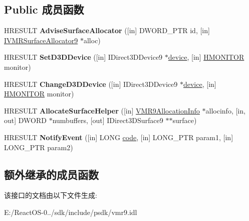 \subsection*{Public 成员函数}
\begin{DoxyCompactItemize}
\item 
\mbox{\label{interface_i_v_m_r_surface_allocator_notify9_aeddb07caec585fac147ac63ad9b7352d}} 
H\+R\+E\+S\+U\+LT {\bfseries Advise\+Surface\+Allocator} (\mbox{[}in\mbox{]} D\+W\+O\+R\+D\+\_\+\+P\+TR id, \mbox{[}in\mbox{]} \hyperlink{interface_i_v_m_r_surface_allocator9}{I\+V\+M\+R\+Surface\+Allocator9} $\ast$alloc)
\item 
\mbox{\label{interface_i_v_m_r_surface_allocator_notify9_a6fc50bf0e1d07c0b93470ddc4c45b142}} 
H\+R\+E\+S\+U\+LT {\bfseries Set\+D3\+D\+Device} (\mbox{[}in\mbox{]} I\+Direct3\+D\+Device9 $\ast$\hyperlink{structdevice}{device}, \mbox{[}in\mbox{]} \hyperlink{interfacevoid}{H\+M\+O\+N\+I\+T\+OR} monitor)
\item 
\mbox{\label{interface_i_v_m_r_surface_allocator_notify9_ab828cb18b6481c8e174277fc355c50d3}} 
H\+R\+E\+S\+U\+LT {\bfseries Change\+D3\+D\+Device} (\mbox{[}in\mbox{]} I\+Direct3\+D\+Device9 $\ast$\hyperlink{structdevice}{device}, \mbox{[}in\mbox{]} \hyperlink{interfacevoid}{H\+M\+O\+N\+I\+T\+OR} monitor)
\item 
\mbox{\label{interface_i_v_m_r_surface_allocator_notify9_ad7797d9c2fdd9194765b80db83f09927}} 
H\+R\+E\+S\+U\+LT {\bfseries Allocate\+Surface\+Helper} (\mbox{[}in\mbox{]} \hyperlink{struct___v_m_r9_allocation_info}{V\+M\+R9\+Allocation\+Info} $\ast$allocinfo, \mbox{[}in, out\mbox{]} D\+W\+O\+RD $\ast$numbuffers, \mbox{[}out\mbox{]} I\+Direct3\+D\+Surface9 $\ast$$\ast$surface)
\item 
\mbox{\label{interface_i_v_m_r_surface_allocator_notify9_a8a36e9e283149815b786d0baeac7d587}} 
H\+R\+E\+S\+U\+LT {\bfseries Notify\+Event} (\mbox{[}in\mbox{]} L\+O\+NG \hyperlink{structcode}{code}, \mbox{[}in\mbox{]} L\+O\+N\+G\+\_\+\+P\+TR param1, \mbox{[}in\mbox{]} L\+O\+N\+G\+\_\+\+P\+TR param2)
\end{DoxyCompactItemize}
\subsection*{额外继承的成员函数}


该接口的文档由以下文件生成\+:\begin{DoxyCompactItemize}
\item 
E\+:/\+React\+O\+S-\/0../sdk/include/psdk/vmr9.\+idl\end{DoxyCompactItemize}
